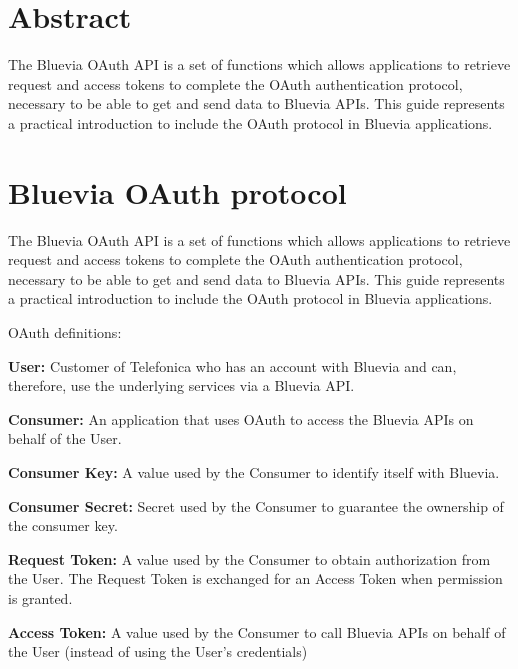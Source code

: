 \hypertarget{blv_oauth_guide_oauth_abstract_sec}{}\section{Abstract}\label{blv_oauth_guide_oauth_abstract_sec}
The Bluevia OAuth API is a set of functions which allows applications to retrieve request and access tokens to complete the OAuth authentication protocol, necessary to be able to get and send data to Bluevia APIs. This guide represents a practical introduction to include the OAuth protocol in Bluevia applications.\hypertarget{blv_oauth_guide_oauth_protocol_sec}{}\section{Bluevia OAuth protocol}\label{blv_oauth_guide_oauth_protocol_sec}
The Bluevia OAuth API is a set of functions which allows applications to retrieve request and access tokens to complete the OAuth authentication protocol, necessary to be able to get and send data to Bluevia APIs. This guide represents a practical introduction to include the OAuth protocol in Bluevia applications.

OAuth definitions:


\begin{DoxyItemize}
\item {\bfseries User:} Customer of Telefonica who has an account with Bluevia and can, therefore, use the underlying services via a Bluevia API. 
\item {\bfseries Consumer:} An application that uses OAuth to access the Bluevia APIs on behalf of the User. 
\item {\bfseries Consumer Key:} A value used by the Consumer to identify itself with Bluevia. 
\item {\bfseries Consumer Secret:} Secret used by the Consumer to guarantee the ownership of the consumer key. 
\item {\bfseries Request Token:} A value used by the Consumer to obtain authorization from the User. The Request Token is exchanged for an Access Token when permission is granted. 
\item {\bfseries Access Token:} A value used by the Consumer to call Bluevia APIs on behalf of the User (instead of using the User’s credentials) 
\end{DoxyItemize}

